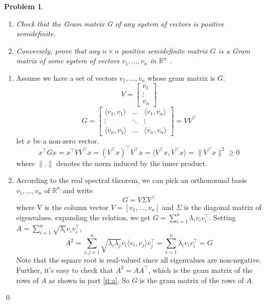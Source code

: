 \documentclass[12pt]{article}
\newtheorem{ex}{Problem}
\begin{document}
\begin{bx}
	
	\begin{ex}\;
		\begin{enumerate}[label=(\alph*)]
			\item Check that the Gram matrix G of any system of vectors is positive semidefinite.
			\item Conversely, prove that any $n\times n$ positive semidefinite matrix $G$ is a Gram matrix
			of some system of vectors $v_1,\dots,v_n$ in $\mathbb{R}^n$ .
		\end{enumerate}
	\end{ex}
\tcblower
\begin{enumerate}[label=(\alph*)]
\item \label{it:a} Assume we have a set of vectors $v_1,\dots,v_n$ whose gram matrix is $G$.
\[
V = 
\begin{bmatrix}
v_1 \\
\vdots \\
v_n
\end{bmatrix}
\]
\[
G = 
\begin{bmatrix}
	\langle v_1,v_1\rangle & \dots & \langle v_1,v_n\rangle \\
	\vdots & \ddots&\vdots \\
	\langle v_n,v_1\rangle & \dots & \langle v_n,v_n\rangle
\end{bmatrix}
= VV^{\top}
\]
let $x$ be a non-zero vector. 
\[
x^{\top}Gx=x^{\top}VV^{\top}x = (V^{\top}x)^{\top}V^{\top}x = \langle V^{\top}x,V^{\top}x \rangle = \|V^{\top}x\|^2\ge 0
\]
where $\|.\|$ denotes the norm induced by the inner product.
\item According to the real spectral theorem, we can pick an orthonormal basis $v_1,\dots,v_n$ of $\mathbb{R}^n$ and write 
\[
G = V\Sigma V^{\top}
\]
where V is the column vector $V = [v_1,\dots,v_n]$ and $\Sigma$ is the diagonal matrix of eigenvalues.
expanding the relation, we get $G=\sum_{i=1}^{n}\lambda_iv_iv_i^{\top}$.
Setting $A=\sum_{i=1}^{n}\sqrt{\lambda_i}v_iv_i^{\top}$,
\[
A^2 = \sum_{i,j=1}^{n}\sqrt{\lambda_i\lambda_j}v_i\langle v_i,v_j \rangle v_j^{\top} = \sum_{i=1}^{n}\lambda_iv_iv_i^{\top} = G
\]
Note that the square root is real-valued since all eigenvalues are non-negative.
Further, it's easy to check that $A^2=AA^{\top}$, which is the gram matrix of the rows of $A$ as shown in part \ref{it:a}. So $G$ is the gram matrix of the rows of $A$.
\end{enumerate}
\qed
\end{bx}
\end{document}

